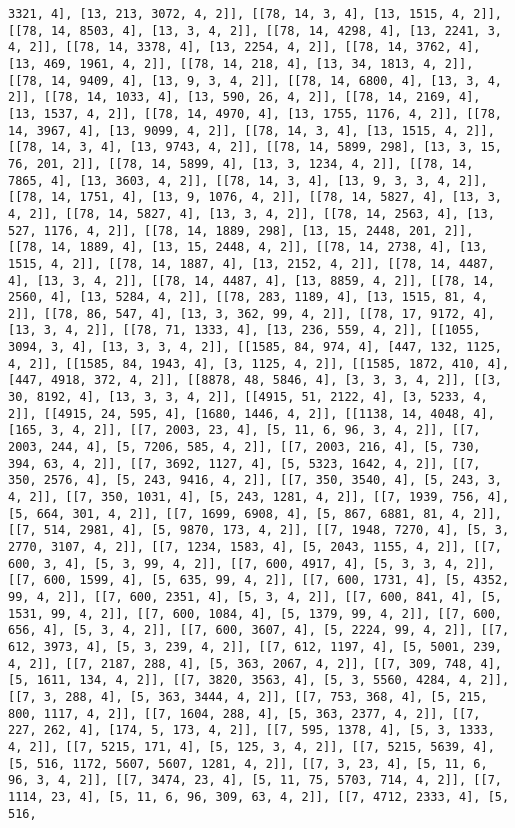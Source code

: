 \documentclass[12pt,fleqn]{article}\usepackage{../../common}
\begin{document}
\begin{verbatim}
3321, 4], [13, 213, 3072, 4, 2]], [[78, 14, 3, 4], [13, 1515, 4, 2]], [[78, 14, 8503, 4], [13, 3, 4, 2]], [[78, 14, 4298, 4], [13, 2241, 3, 4, 2]], [[78, 14, 3378, 4], [13, 2254, 4, 2]], [[78, 14, 3762, 4], [13, 469, 1961, 4, 2]], [[78, 14, 218, 4], [13, 34, 1813, 4, 2]], [[78, 14, 9409, 4], [13, 9, 3, 4, 2]], [[78, 14, 6800, 4], [13, 3, 4, 2]], [[78, 14, 1033, 4], [13, 590, 26, 4, 2]], [[78, 14, 2169, 4], [13, 1537, 4, 2]], [[78, 14, 4970, 4], [13, 1755, 1176, 4, 2]], [[78, 14, 3967, 4], [13, 9099, 4, 2]], [[78, 14, 3, 4], [13, 1515, 4, 2]], [[78, 14, 3, 4], [13, 9743, 4, 2]], [[78, 14, 5899, 298], [13, 3, 15, 76, 201, 2]], [[78, 14, 5899, 4], [13, 3, 1234, 4, 2]], [[78, 14, 7865, 4], [13, 3603, 4, 2]], [[78, 14, 3, 4], [13, 9, 3, 3, 4, 2]], [[78, 14, 1751, 4], [13, 9, 1076, 4, 2]], [[78, 14, 5827, 4], [13, 3, 4, 2]], [[78, 14, 5827, 4], [13, 3, 4, 2]], [[78, 14, 2563, 4], [13, 527, 1176, 4, 2]], [[78, 14, 1889, 298], [13, 15, 2448, 201, 2]], [[78, 14, 1889, 4], [13, 15, 2448, 4, 2]], [[78, 14, 2738, 4], [13, 1515, 4, 2]], [[78, 14, 1887, 4], [13, 2152, 4, 2]], [[78, 14, 4487, 4], [13, 3, 4, 2]], [[78, 14, 4487, 4], [13, 8859, 4, 2]], [[78, 14, 2560, 4], [13, 5284, 4, 2]], [[78, 283, 1189, 4], [13, 1515, 81, 4, 2]], [[78, 86, 547, 4], [13, 3, 362, 99, 4, 2]], [[78, 17, 9172, 4], [13, 3, 4, 2]], [[78, 71, 1333, 4], [13, 236, 559, 4, 2]], [[1055, 3094, 3, 4], [13, 3, 3, 4, 2]], [[1585, 84, 974, 4], [447, 132, 1125, 4, 2]], [[1585, 84, 1943, 4], [3, 1125, 4, 2]], [[1585, 1872, 410, 4], [447, 4918, 372, 4, 2]], [[8878, 48, 5846, 4], [3, 3, 3, 4, 2]], [[3, 30, 8192, 4], [13, 3, 3, 4, 2]], [[4915, 51, 2122, 4], [3, 5233, 4, 2]], [[4915, 24, 595, 4], [1680, 1446, 4, 2]], [[1138, 14, 4048, 4], [165, 3, 4, 2]], [[7, 2003, 23, 4], [5, 11, 6, 96, 3, 4, 2]], [[7, 2003, 244, 4], [5, 7206, 585, 4, 2]], [[7, 2003, 216, 4], [5, 730, 394, 63, 4, 2]], [[7, 3692, 1127, 4], [5, 5323, 1642, 4, 2]], [[7, 350, 2576, 4], [5, 243, 9416, 4, 2]], [[7, 350, 3540, 4], [5, 243, 3, 4, 2]], [[7, 350, 1031, 4], [5, 243, 1281, 4, 2]], [[7, 1939, 756, 4], [5, 664, 301, 4, 2]], [[7, 1699, 6908, 4], [5, 867, 6881, 81, 4, 2]], [[7, 514, 2981, 4], [5, 9870, 173, 4, 2]], [[7, 1948, 7270, 4], [5, 3, 2770, 3107, 4, 2]], [[7, 1234, 1583, 4], [5, 2043, 1155, 4, 2]], [[7, 600, 3, 4], [5, 3, 99, 4, 2]], [[7, 600, 4917, 4], [5, 3, 3, 4, 2]], [[7, 600, 1599, 4], [5, 635, 99, 4, 2]], [[7, 600, 1731, 4], [5, 4352, 99, 4, 2]], [[7, 600, 2351, 4], [5, 3, 4, 2]], [[7, 600, 841, 4], [5, 1531, 99, 4, 2]], [[7, 600, 1084, 4], [5, 1379, 99, 4, 2]], [[7, 600, 656, 4], [5, 3, 4, 2]], [[7, 600, 3607, 4], [5, 2224, 99, 4, 2]], [[7, 612, 3973, 4], [5, 3, 239, 4, 2]], [[7, 612, 1197, 4], [5, 5001, 239, 4, 2]], [[7, 2187, 288, 4], [5, 363, 2067, 4, 2]], [[7, 309, 748, 4], [5, 1611, 134, 4, 2]], [[7, 3820, 3563, 4], [5, 3, 5560, 4284, 4, 2]], [[7, 3, 288, 4], [5, 363, 3444, 4, 2]], [[7, 753, 368, 4], [5, 215, 800, 1117, 4, 2]], [[7, 1604, 288, 4], [5, 363, 2377, 4, 2]], [[7, 227, 262, 4], [174, 5, 173, 4, 2]], [[7, 595, 1378, 4], [5, 3, 1333, 4, 2]], [[7, 5215, 171, 4], [5, 125, 3, 4, 2]], [[7, 5215, 5639, 4], [5, 516, 1172, 5607, 5607, 1281, 4, 2]], [[7, 3, 23, 4], [5, 11, 6, 96, 3, 4, 2]], [[7, 3474, 23, 4], [5, 11, 75, 5703, 714, 4, 2]], [[7, 1114, 23, 4], [5, 11, 6, 96, 309, 63, 4, 2]], [[7, 4712, 2333, 4], [5, 516, 
\end{verbatim}
\end{document}
